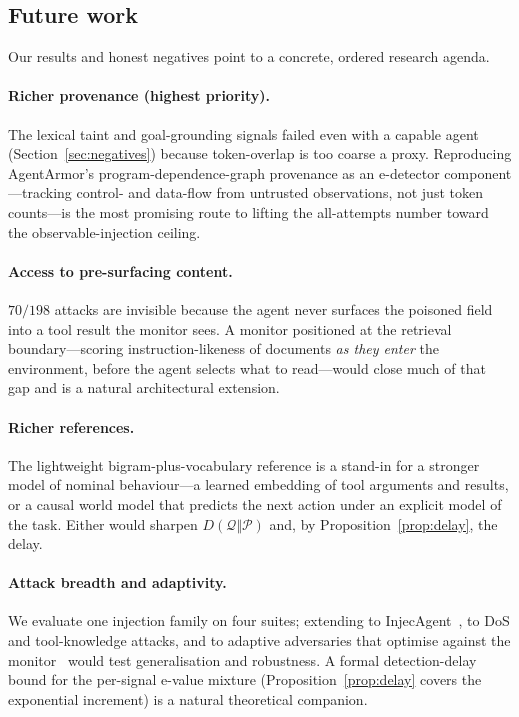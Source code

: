 \documentclass[pdflatex,sn-mathphys-num]{sn-jnl}%
\theoremstyle{thmstyleone}%
\theoremstyle{thmstyletwo}%
\theoremstyle{thmstylethree}%
\newcommand{\Pcal}{\mathcal{P}}
\newcommand{\Qcal}{\mathcal{Q}}
\begin{document}
\subsection{Future work}\label{sec:future}

Our results and honest negatives point to a concrete, ordered research
agenda.

\paragraph{Richer provenance (highest priority).} The lexical taint and
goal-grounding signals failed even with a capable agent
(Section~\ref{sec:negatives}) because token-overlap is too coarse a proxy.
Reproducing AgentArmor's program-dependence-graph provenance as an e-detector
component---tracking control- and data-flow from untrusted observations, not
just token counts---is the most promising route to lifting the all-attempts
number toward the observable-injection ceiling.

\paragraph{Access to pre-surfacing content.} \(70/198\) attacks are invisible
because the agent never surfaces the poisoned field into a tool result the
monitor sees. A monitor positioned at the retrieval boundary---scoring
instruction-likeness of documents \emph{as they enter} the environment, before
the agent selects what to read---would close much of that gap and is a natural
architectural extension.

\paragraph{Richer references.} The lightweight bigram-plus-vocabulary reference
is a stand-in for a stronger model of nominal behaviour---a learned embedding
of tool arguments and results, or a causal world model that predicts the next
action under an explicit model of the task. Either would sharpen
\(D(\Qcal\Vert\Pcal)\) and, by Proposition~\ref{prop:delay}, the delay.

\paragraph{Attack breadth and adaptivity.} We evaluate one injection family on
four suites; extending to InjecAgent~\cite{zhan2024injecagent}, to DoS and
tool-knowledge attacks, and to adaptive adversaries that optimise against the
monitor~\cite{nasr2025attackersecond} would test generalisation and
robustness. A formal detection-delay bound for the per-signal e-value mixture
(Proposition~\ref{prop:delay} covers the exponential increment) is a natural
theoretical companion.
\end{document}
